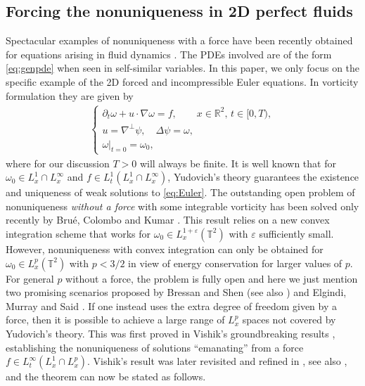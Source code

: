 \documentclass[11pt,reqno]{amsproc}
\def\eps{\varepsilon}
\def\de{{\partial}}
\def\RR {\mathbb{R}}
\def\TT {\mathbb{T}}
\theoremstyle{definition}
\theoremstyle{definition}
\numberwithin{equation}{section}
\begin{document}
\subsection{Forcing the nonuniqueness in 2D perfect fluids}
\label{sec:vishik}
Spectacular examples of nonuniqueness with a force have been recently obtained for equations arising in fluid dynamics \cite{jia2015incompressible,vishik_notes,castro2024proof,albritton23Leray,albritton23Hypo,albritton22annals}. The PDEs involved are of the form \cref{eq:genpde} when seen in self-similar variables. In this paper, we only focus on the specific example of the 2D forced and incompressible Euler equations. In vorticity formulation they are given by
\begin{align}
\label{eq:Euler}
\begin{cases}\de_t \omega +u\cdot \nabla \omega=f, \qquad x\in \RR^2, \, t\in [0,T),\\
u=\nabla^\perp\psi, \quad \Delta \psi=\omega,\\
\omega|_{t=0}=\omega_0,
\end{cases}
\end{align}
where for our discussion $T>0$ will always be finite.
It is well known that for $\omega_0\in L^1_x\cap L^\infty_x$ and $f\in L^1_t(L^1_x\cap L^\infty_x)$, Yudovich's theory \cite{yudovich1963non} guarantees the existence and uniqueness of  weak solutions to \cref{eq:Euler}. The outstanding open problem of nonuniqueness \emph{without a force} with some integrable vorticity has been solved only recently by Brué, Colombo and Kumar \cite{brue2024flexibility}. This result relies on a new convex integration scheme that works for $\omega_0\in L^{1+\eps}_x(\TT^2)$ with $\eps$ sufficiently small. However, nonuniqueness with convex integration  can only be obtained  for $\omega_0 \in L^p_x(\TT^2)$ with $p<3/2$ in view of energy conservation for larger values of $p$. For general $p$ without a force, the problem is fully open and here we just mention two promising scenarios proposed by Bressan and Shen \cite{bressan21shen} (see also \cite{bressan20murray}) and Elgindi, Murray and Said \cite{elgindi2023wellposedness}. 
If one instead uses the extra degree of freedom given by a force, then it is possible to achieve a large range of $L^p_x$ spaces not covered by Yudovich's theory. This was first proved in Vishik's groundbreaking results  \cite{vishik2018instability1,vishik2018instability2}, establishing the nonuniqueness of solutions ``emanating'' from a force  $f\in L^\infty_t(L^1_x\cap L^p_x)$.  Vishik's result was later revisited and refined in \cite{vishik_notes}, see also \cite{castro2024proof}, and the theorem can now be stated as follows.
\end{document}

